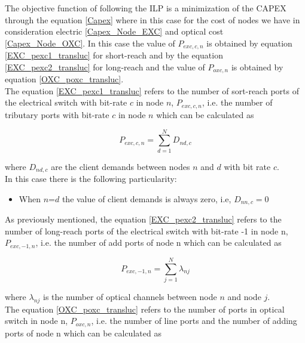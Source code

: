 \vspace{7pt}
The objective function of following the ILP is a minimization of the CAPEX through the equation \ref{Capex} where in this case for the cost of nodes we have in consideration electric \ref{Capex_Node_EXC} and optical cost \ref{Capex_Node_OXC}. In this case the value of $P_{exc,c,n}$ is obtained by equation \ref{EXC_pexc1_transluc} for short-reach and by the equation \ref{EXC_pexc2_transluc} for long-reach and the value of $P_{oxc,n}$ is obtained by equation \ref{OXC_poxc_transluc}.\\

The equation \ref{EXC_pexc1_transluc} refers to the number of sort-reach ports of the electrical switch with bit-rate $c$ in node $n$, $P_{exc,c,n}$, i.e. the number of tributary ports with bit-rate $c$ in node $n$ which can be calculated as

\begin{equation}
P_{exc,c,n} = \sum_{d=1}^{N} D_{nd,c}
\label{EXC_pexc1_transluc}
\end{equation}

\vspace{11pt}
\noindent
where $D_{nd,c}$ are the client demands between nodes $n$ and $d$ with bit rate $c$.\\

In this case there is the following particularity:
\begin{itemize}
  \item When $n$=$d$ the value of client demands is always zero, i.e, $D_{nn,c}=0$
\end{itemize}

\vspace{11pt}
As previously mentioned, the equation \ref{EXC_pexc2_transluc} refers to the number of long-reach ports of the electrical switch with bit-rate -1 in node n, $P_{exc,-1,n}$, i.e. the number of add ports of node n which can be calculated as

\begin{equation}
P_{exc,-1,n} = \sum_{j=1}^{N} \lambda_{nj}
\label{EXC_pexc2_transluc}
\end{equation}

\vspace{11pt}
\noindent
where $\lambda_{nj}$ is the number of optical channels between node $n$ and node $j$.\\

The equation \ref{OXC_poxc_transluc} refers to the number of ports in optical switch in node n, $P_{oxc,n}$, i.e. the number of line ports and the number of adding ports of node n which can be calculated as

